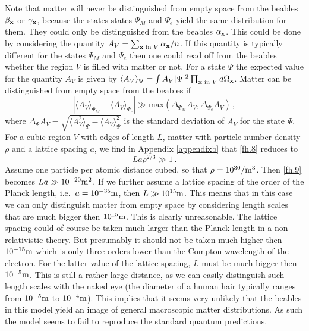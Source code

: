 \documentclass[12pt]{article}
\begin{document}
Note that matter will never be distinguished from empty space from the beables $\beta_{\bf x}$ or $\gamma_{\bf x}$, because the states states $\Psi_M$ and $\Psi_e$ yield the same distribution for them. They could only be distinguished from the beables $\alpha_{\bf x}$. This could be done by considering the quantity $A_V= \sum_{{\bf x} {\textrm{ in }}V} \alpha_{\bf x} / n$. If this quantity is typically different for the states $\Psi_M$ and $\Psi_e$ then one could read off from the beables whether the region $V$ is filled with matter or not. For a state $\Psi$ the expected value for the quantity $A_V$ is given by $\langle A_V \rangle_\Psi = \int  A_V |\Psi|^2\prod_{{\bf x} {\textrm{ in }}V } d \Omega_{\bf x}$. Matter can be distinguished from empty space from the beables if 
\begin{equation}
\left| \langle A_V \rangle_{\Psi_M} - \langle A_V \rangle_{\Psi_e} \right| \gg {\textrm{max}} \left( \Delta_{\Psi_M}A_V ,\Delta_{\Psi_e} A_V  \right)\,,
\label{fh.8}
\end{equation}
where $\Delta_{\Psi}A_V = \sqrt{\langle A_V^2 \rangle_\Psi - \langle A_V \rangle_\Psi^2}$ is the standard deviation of $A_V$ for the state $\Psi$. For a cubic region $V$ with edges of length $L$, matter with particle number density $\rho$ and a lattice spacing $a$, we find in Appendix \ref{appendixb} that \eqref{fh.8} reduces to
\begin{equation}
La\rho^{2/3} \gg 1 \,.
\label{fh.9}
\end{equation}
Assume one particle per atomic distance cubed, so that $\rho = 10^{30}/{\textrm m}^3$. Then \eqref{fh.9} becomes $La  \gg 10^{-20} {\textrm m}^2$. If we further assume a lattice spacing of the order of the Planck length, i.e.\ $a = 10^{-35}{\textrm m}$, then $L \gg 10^{15}{\textrm m}$. This means that in this case we can only distinguish matter from empty space by considering length scales that are much bigger then $10^{15}{\textrm m}$. This is clearly unreasonable. The lattice spacing could of course be taken much larger than the Planck length in a non-relativistic theory. But presumably it should not be taken much higher then $10^{-15}{\textrm m}$ which is only three orders lower than the Compton wavelength of the electron. For the latter value of the lattice spacing, $L$ must be much bigger then $10^{-5}{\textrm m}$. This is still a rather large distance, as we can easily distinguish such length scales with the naked eye (the diameter of a human hair typically ranges from $10^{-5}{\textrm m}$ to $10^{-4}{\textrm m}$). This implies that it seems very unlikely that the beables in this model yield an image of general macroscopic matter distributions. As such the model seems to fail to reproduce the standard quantum predictions. 
\end{document}
